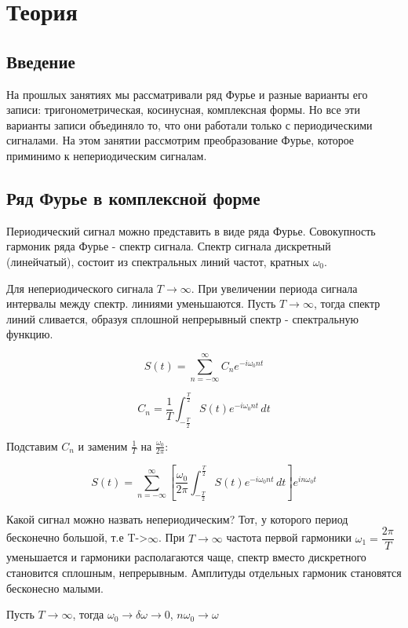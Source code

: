 \chapter{Теория}
\label{ch:intro}

\section*{\textbf{Введение}}

На прошлых занятиях мы рассматривали ряд Фурье и разные варианты его записи: тригонометрическая, косинусная, комплексная формы. Но все эти варианты записи
объединяло то, что они работали только с периодическими сигналами. На этом занятии рассмотрим преобразование Фурье, которое приминимо к непериодическим сигналам.

\section*{\textbf{Ряд Фурье в комплексной форме}}

Периодический сигнал можно представить в виде ряда Фурье. Совокупность гармоник ряда Фурье - спектр сигнала. Спектр сигнала дискретный (линейчатый), состоит из 
спектральных линий частот, кратных $\omega_0$.

Для непериодического сигнала $T \rightarrow \infty$. При увеличении периода сигнала интервалы между спектр. линиями уменьшаются. Пусть $T \rightarrow \infty$, 
тогда спектр линий сливается, образуя сплошной непрерывный спектр - спектральную функцию.

\[
S(t) = \sum_{n=-\infty}^{\infty} C_n e^{-i\omega_0nt}
\]

\[
C_n = \frac{1}{T} \int_{-\frac{T}{2}}^{\frac{T}{2}} S(t)e^{-i\omega_0nt} \, dt
\]

Подставим $C_n$ и заменим $\frac{1}{T}$ на $\frac{\omega_0}{2\pi}$:

\[
S(t) = \sum_{n=-\infty}^{\infty} \left[ \frac{\omega_0}{2\pi} \int_{-\frac{T}{2}}^{\frac{T}{2}} S(t)e^{-i\omega_0nt} \, dt \right] e^{in\omega_0t}
\]

Какой сигнал можно назвать непериодическим? Тот, у которого период бесконечно большой, т.е T->$\infty$. При \(T \to \infty\) частота первой гармоники 
\(\omega_1 = \dfrac{2\pi}{T}\) уменьшается и гармоники располагаются чаще, спектр вместо дискретного становится сплошным, непрерывным. Амплитуды отдельных гармоник 
становятся бесконесно малыми.


Пусть $T \rightarrow \infty$, тогда $\omega_0 \rightarrow\delta \omega \to 0$, $n\omega_0 \rightarrow \omega$

